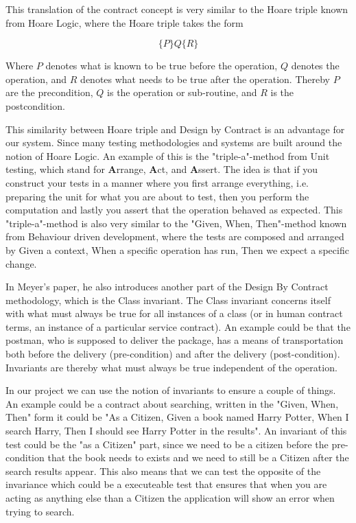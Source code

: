 This translation of the contract concept is very similar to the Hoare triple known from Hoare Logic, where the Hoare triple takes the form

\begin{equation}
\{P\} Q \{R\}
\end{equation}

Where $P$ denotes what is known to be true before the operation, $Q$ denotes the operation, and $R$ denotes what needs to be true after the operation. Thereby $P$ are the precondition, $Q$ is the operation or sub-routine, and $R$ is the postcondition. 

This similarity between Hoare triple and Design by Contract is an advantage for our system. Since many testing methodologies and systems are built around the notion of Hoare Logic. 
An example of this is the "triple-a"-method from Unit testing, which stand for \textbf{A}rrange, \textbf{A}ct, and \textbf{A}ssert.
The idea is that if you construct your tests in a manner where you first arrange everything, i.e. preparing the unit for what you are about to test, then you perform the computation and lastly you assert that the operation behaved as expected. 
This "triple-a"-method is also very similar to the "Given, When, Then"-method known from Behaviour driven development, where the tests are composed and arranged by Given a context, When a specific operation has run, Then we expect a specific change. 

In Meyer's paper, he also introduces another part of the Design By Contract methodology, which is the Class invariant. The Class invariant concerns itself with what must always be true for all instances of a class (or in human contract terms, an instance of a particular service contract). An example could be that the postman, who is supposed to deliver the package, has a means of transportation both before the delivery (pre-condition) and after the delivery (post-condition). Invariants are thereby what must always be true independent of the operation.

In our project we can use the notion of invariants to ensure a couple of things. 
An example could be a contract about searching, written in the "Given, When, Then" form it could be "As a Citizen, Given a book named Harry Potter, When I search Harry, Then I should see Harry Potter in the results".
An invariant of this test could be the "as a Citizen" part, since we need to be a citizen before the pre-condition that the book needs to exists and we need to still be a Citizen after the search results appear.
This also means that we can test the opposite of the invariance which could be a executeable test that ensures that when you are acting as anything else than a Citizen the application will show an error when trying to search.

